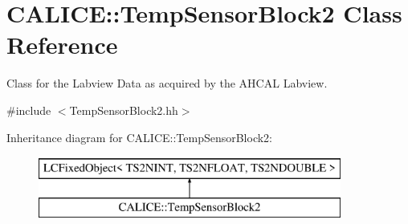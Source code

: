 \section{C\-A\-L\-I\-C\-E\-:\-:Temp\-Sensor\-Block2 Class Reference}
\label{classCALICE_1_1TempSensorBlock2}


Class for the Labview Data as acquired by the A\-H\-C\-A\-L Labview.  




{\ttfamily \#include $<$Temp\-Sensor\-Block2.\-hh$>$}

Inheritance diagram for C\-A\-L\-I\-C\-E\-:\-:Temp\-Sensor\-Block2\-:\begin{figure}[H]
\begin{center}
\leavevmode
\includegraphics[height=2.000000cm]{classCALICE_1_1TempSensorBlock2}
\end{center}
\end{figure}
